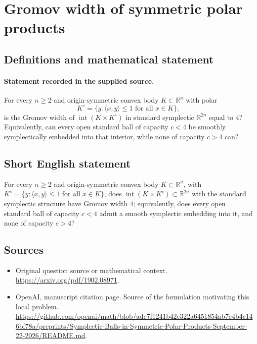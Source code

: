 \documentclass[11pt]{article}
\begin{document}
\section*{Gromov width of symmetric polar products}\label{statement}
\subsection{Definitions and mathematical statement}
\paragraph{Statement recorded in the supplied source.}
For every $n\geq2$ and origin-symmetric convex body $K\subset\mathbb{R}^n$ with polar
\[
K^\circ=\{y:\langle x,y\rangle\leq1\text{ for all }x\in K\},
\]
is the Gromov width of $\operatorname{int}(K\times K^\circ)$ in standard symplectic $\mathbb{R}^{2n}$ equal to $4$? Equivalently, can every open standard ball of capacity $c<4$ be smoothly symplectically embedded into that interior, while none of capacity $c>4$ can?
\subsection{Short English statement}
For every $n\geq2$ and origin-symmetric convex body $K\subset\mathbb{R}^n$, with $K^\circ=\{y:\langle x,y\rangle\leq1\text{ for all }x\in K\}$, does $\operatorname{int}(K\times K^\circ)\subset\mathbb{R}^{2n}$ with the standard symplectic structure have Gromov width $4$; equivalently, does every open standard ball of capacity $c<4$ admit a smooth symplectic embedding into it, and none of capacity $c>4$?
\subsection{Sources}
\begin{itemize}
\item[S1] Original question source or mathematical context.
\url{https://arxiv.org/pdf/1902.08971}.
\item[S2] OpenAI, manuscript citation page. Source of the formulation motivating this local problem.
\url{https://github.com/openai/math/blob/adc7f1241b42e322a6451854ab7e4b4c146bf78a/preprints/Symplectic-Balls-in-Symmetric-Polar-Products-September-22-2026/README.md}.
\end{itemize}
\end{document}
